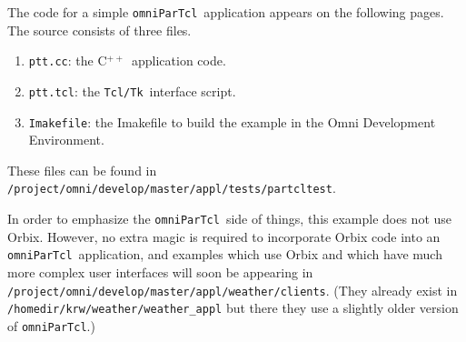 \documentclass[11pt]{article}
\def\omniParTcl{{\tt omniParTcl}}
\def\tcltk{{\tt Tcl/Tk}}
\def\CXX{\relax C$^{++}$\relax}
\begin{document}
The code for a simple \omniParTcl\ application appears on the following
pages.  The source consists of three files.

\begin{enumerate}
\item {\tt ptt.cc}: the \CXX\ application code.
\item {\tt ptt.tcl}: the \tcltk\ interface script.
\item {\tt Imakefile}: the Imakefile to build the example in the Omni
                       Development Environment.
\end{enumerate}

\noindent
These files can be found in
{\tt /project/omni/develop/master/appl/tests/partcltest}.

\medskip

In order to emphasize the \omniParTcl\ side of things, this example does
not use Orbix.  However, no extra magic is required to incorporate Orbix
code into an \omniParTcl\ application, and examples which use Orbix
and which have much more complex user interfaces will soon be
appearing in {\tt /project/omni/develop/master/appl/weather/clients}.
(They already exist in {\tt /homedir/krw/weather/weather\_appl} but there
they use a slightly older version of \omniParTcl.)
\end{document}
